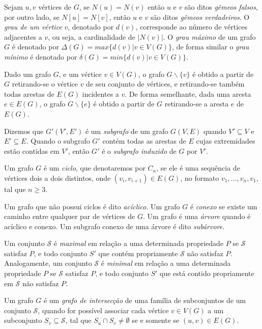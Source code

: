 Sejam $u, v$ vértices de $G$, se $N(u) = N(v)$ então $u$ e $v$ são ditos \emph{gêmeos falsos}, por outro lado, se $N[u] = N[v]$, então $u$ e $v$ são ditos \emph{gêmeos verdadeiros}. O \emph{grau de um vértice} $v$, denotado por $d(v)$, corresponde ao número de vértices adjacentes a $v$, ou seja, a cardinalidade de $|N(v)|$. O \emph{grau máximo} de um grafo $G$ é denotado por $\Delta(G) = max\{d(v) | v \in V(G)\}$, de forma similar o \emph{grau mínimo} é denotado por $\delta(G) = min\{d(v) | v \in V(G)\}$.

Dado um grafo $G$, e um vértice $v \in V(G)$, o grafo $G\backslash \{v\}$ é obtido a partir de $G$ retirando-se o vértice $v$ de seu conjunto de vértices, e retirando-se também todas arestas de $E(G)$ incidentes a $v$. De forma semelhante, dada uma aresta $e \in E(G)$, o grafo $G\backslash \{e\}$ é obtido a partir de $G$ retirando-se a aresta $e$ de $E(G)$.

Dizemos que $G'(V',E')$ é um \emph{subgrafo} de um grafo $G(V,E)$ quando $V'\subseteq V$ e $E'\subseteq E$. Quando o subgrafo $G'$ contém todas as arestas de $E$ cujas extremidades estão contidas em $V'$, então $G'$ é o \emph{subgrafo induzido} de $G$ por $V'$.  

Um grafo $G$ é um \emph{ciclo}, que denotaremos por $C_n$, se ele é uma sequência de vértices dois a dois distintos, onde $(v_i, v_{i+1})\in E(G)$, no formato  $v_1, \dots, v_n, v_1$, tal que $n\geq 3$. 

Um grafo que não possui ciclos é dito \emph{acíclico}. Um grafo $G$ é \emph{conexo} se existe um caminho entre qualquer par de vértices de $G$. Um grafo é uma \emph{árvore} quando é acíclico e conexo. Um subgrafo conexo de uma árvore é dito \emph{subárvore}.

Um conjunto $\mathcal{S}$ é \emph{maximal} em relação a uma determinada propriedade $P$ se $\mathcal{S}$ satisfaz $P$, e todo conjunto $S'$ que contém propriamente $\mathcal{S}$ não satisfaz $P$. Analogamente, um conjunto $\mathcal{S}$ é \emph{minimal} em relação a uma determinada propriedade $P$ se $\mathcal{S}$ satisfaz $P$, e todo conjunto $S'$ que está contido propriamente em $\mathcal{S}$ não satisfaz $P$.

Um grafo $G$ é um \emph{grafo de intersecção} de uma família de subconjuntos de um conjunto $\mathcal{S}$, quando for possível associar cada vértice $v \in V(G)$ a um subconjunto $S_v \subseteq \mathcal{S}$, tal que $S_u \cap S_v \neq \emptyset$ se e somente se $(u,v)\in E(G)$. 


